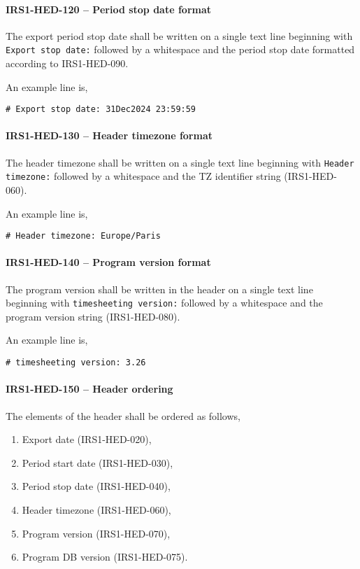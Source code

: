 \paragraph{IRS1-HED-120 -- Period stop date format}
The export period stop date shall be written on a single text line beginning
with \lstinline{Export stop date:} followed by a whitespace and the period
stop date formatted according to IRS1-HED-090.

An example line is,
\begin{lstlisting}[numbers=none]
  # Export stop date: 31Dec2024 23:59:59
\end{lstlisting}

\paragraph{IRS1-HED-130 -- Header timezone format}
The header timezone shall be written on a single text line
beginning with \lstinline{Header timezone:} followed by a whitespace
and the TZ identifier string (IRS1-HED-060).

An example line is,
\begin{lstlisting}[numbers=none]
  # Header timezone: Europe/Paris
\end{lstlisting}

\paragraph{IRS1-HED-140 -- Program version format}
The program version shall be written in the header on a single text line
beginning with \lstinline{timesheeting version:} followed by a whitespace
and the program version string (IRS1-HED-080).

An example line is,
\begin{lstlisting}[numbers=none]
  # timesheeting version: 3.26
\end{lstlisting}

\paragraph{IRS1-HED-150 -- Header ordering}
The elements of the header shall be ordered as follows,
\begin{enumerate}
\item Export date (IRS1-HED-020),
\item Period start date (IRS1-HED-030),
\item Period stop date (IRS1-HED-040),
\item Header timezone (IRS1-HED-060),
\item Program version (IRS1-HED-070),
\item Program \gls{DB} version (IRS1-HED-075).
\end{enumerate}

